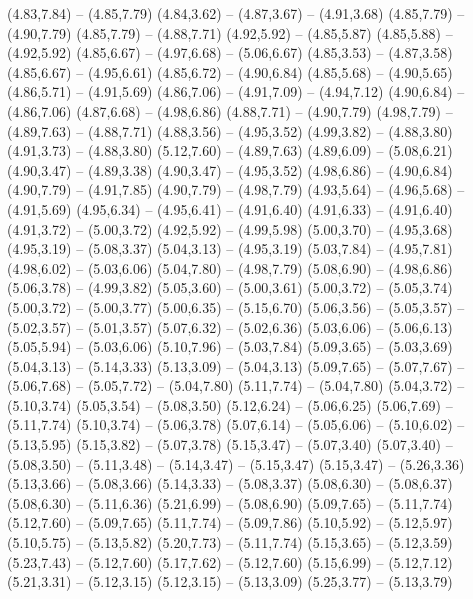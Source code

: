 {  (4.83,7.84) -- (4.85,7.79)
  (4.84,3.62) -- (4.87,3.67) -- (4.91,3.68)
  (4.85,7.79) -- (4.90,7.79)
  (4.85,7.79) -- (4.88,7.71)
  (4.92,5.92) -- (4.85,5.87)
  (4.85,5.88) -- (4.92,5.92)
  (4.85,6.67) -- (4.97,6.68) -- (5.06,6.67)
  (4.85,3.53) -- (4.87,3.58)
  (4.85,6.67) -- (4.95,6.61)
  (4.85,6.72) -- (4.90,6.84)
  (4.85,5.68) -- (4.90,5.65)
  (4.86,5.71) -- (4.91,5.69)
  (4.86,7.06) -- (4.91,7.09) -- (4.94,7.12)
  (4.90,6.84) -- (4.86,7.06)
  (4.87,6.68) -- (4.98,6.86)
  (4.88,7.71) -- (4.90,7.79)
  (4.98,7.79) -- (4.89,7.63) -- (4.88,7.71)
  (4.88,3.56) -- (4.95,3.52)
  (4.99,3.82) -- (4.88,3.80)
  (4.91,3.73) -- (4.88,3.80)
  (5.12,7.60) -- (4.89,7.63)
  (4.89,6.09) -- (5.08,6.21)
  (4.90,3.47) -- (4.89,3.38)
  (4.90,3.47) -- (4.95,3.52)
  (4.98,6.86) -- (4.90,6.84)
  (4.90,7.79) -- (4.91,7.85)
  (4.90,7.79) -- (4.98,7.79)
  (4.93,5.64) -- (4.96,5.68) -- (4.91,5.69)
  (4.95,6.34) -- (4.95,6.41) -- (4.91,6.40)
  (4.91,6.33) -- (4.91,6.40)
  (4.91,3.72) -- (5.00,3.72)
  (4.92,5.92) -- (4.99,5.98)
  (5.00,3.70) -- (4.95,3.68)
  (4.95,3.19) -- (5.08,3.37)
  (5.04,3.13) -- (4.95,3.19)
  (5.03,7.84) -- (4.95,7.81)
  (4.98,6.02) -- (5.03,6.06)
  (5.04,7.80) -- (4.98,7.79)
  (5.08,6.90) -- (4.98,6.86)
  (5.06,3.78) -- (4.99,3.82)
  (5.05,3.60) -- (5.00,3.61)
  (5.00,3.72) -- (5.05,3.74)
  (5.00,3.72) -- (5.00,3.77)
  (5.00,6.35) -- (5.15,6.70)
  (5.06,3.56) -- (5.05,3.57) -- (5.02,3.57) -- (5.01,3.57)
  (5.07,6.32) -- (5.02,6.36)
  (5.03,6.06) -- (5.06,6.13)
  (5.05,5.94) -- (5.03,6.06)
  (5.10,7.96) -- (5.03,7.84)
  (5.09,3.65) -- (5.03,3.69)
  (5.04,3.13) -- (5.14,3.33)
  (5.13,3.09) -- (5.04,3.13)
  (5.09,7.65) -- (5.07,7.67) -- (5.06,7.68) -- (5.05,7.72) -- (5.04,7.80)
  (5.11,7.74) -- (5.04,7.80)
  (5.04,3.72) -- (5.10,3.74)
  (5.05,3.54) -- (5.08,3.50)
  (5.12,6.24) -- (5.06,6.25)
  (5.06,7.69) -- (5.11,7.74)
  (5.10,3.74) -- (5.06,3.78)
  (5.07,6.14) -- (5.05,6.06) -- (5.10,6.02) -- (5.13,5.95)
  (5.15,3.82) -- (5.07,3.78)
  (5.15,3.47) -- (5.07,3.40)
  (5.07,3.40) -- (5.08,3.50) -- (5.11,3.48) -- (5.14,3.47) -- (5.15,3.47)
  (5.15,3.47) -- (5.26,3.36)
  (5.13,3.66) -- (5.08,3.66)
  (5.14,3.33) -- (5.08,3.37)
  (5.08,6.30) -- (5.08,6.37)
  (5.08,6.30) -- (5.11,6.36)
  (5.21,6.99) -- (5.08,6.90)
  (5.09,7.65) -- (5.11,7.74)
  (5.12,7.60) -- (5.09,7.65)
  (5.11,7.74) -- (5.09,7.86)
  (5.10,5.92) -- (5.12,5.97)
  (5.10,5.75) -- (5.13,5.82)
  (5.20,7.73) -- (5.11,7.74)
  (5.15,3.65) -- (5.12,3.59)
  (5.23,7.43) -- (5.12,7.60)
  (5.17,7.62) -- (5.12,7.60)
  (5.15,6.99) -- (5.12,7.12)
  (5.21,3.31) -- (5.12,3.15)
  (5.12,3.15) -- (5.13,3.09)
  (5.25,3.77) -- (5.13,3.79)
}
